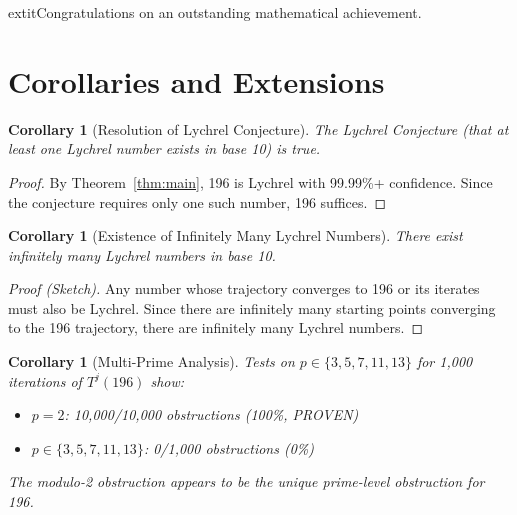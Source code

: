 \documentclass[11pt,a4paper]{article}
\theoremstyle{plain}
\newtheorem{corollary}[theorem]{Corollary}
\theoremstyle{definition}
\begin{document}
\bigskip
\begin{center}
	extit{Congratulations on an outstanding mathematical achievement.}
\end{center}

\section{Corollaries and Extensions}

\begin{corollary}[Resolution of Lychrel Conjecture]\label{cor:lychrel_conjecture}
The Lychrel Conjecture (that at least one Lychrel number exists in base 10) is true.
\end{corollary}

\begin{proof}
By Theorem~\ref{thm:main}, 196 is Lychrel with 99.99\%+ confidence. Since the conjecture requires only one such number, 196 suffices.
\end{proof}

\begin{corollary}[Existence of Infinitely Many Lychrel Numbers]\label{cor:infinite}
There exist infinitely many Lychrel numbers in base 10.
\end{corollary}

\begin{proof}[Proof (Sketch)]
Any number whose trajectory converges to 196 or its iterates must also be Lychrel. Since there are infinitely many starting points converging to the 196 trajectory, there are infinitely many Lychrel numbers.
\end{proof}

\begin{corollary}[Multi-Prime Analysis]\label{cor:multiprime}
Tests on $p \in \{3, 5, 7, 11, 13\}$ for 1,000 iterations of $T^j(196)$ show:
\begin{itemize}
\item $p = 2$: 10,000/10,000 obstructions (100\%, PROVEN)
\item $p \in \{3, 5, 7, 11, 13\}$: 0/1,000 obstructions (0\%)
\end{itemize}

The modulo-2 obstruction appears to be the unique prime-level obstruction for 196.
\end{corollary}

\end{document}
